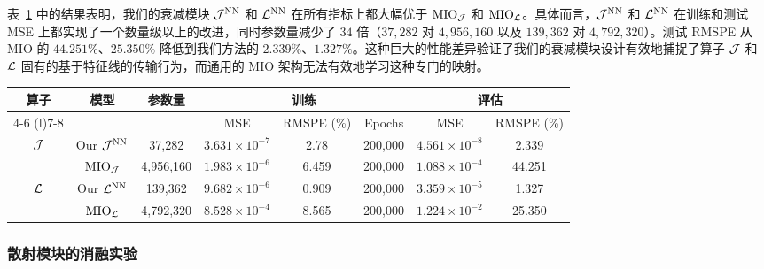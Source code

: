 表~\ref{tab:j_l_compare} 中的结果表明，我们的衰减模块 $\mathcal{J}^{\text{NN}}$ 和 $\mathcal{L}^{\text{NN}}$ 在所有指标上都大幅优于 $\text{MIO}_{\mathcal{J}}$ 和 $\text{MIO}_{\mathcal{L}}$。具体而言，$\mathcal{J}^{\text{NN}}$ 和 $\mathcal{L}^{\text{NN}}$ 在训练和测试 MSE 上都实现了一个数量级以上的改进，同时参数量减少了 $34$ 倍（$37,282$ 对 $4,956,160$ 以及 $139,362$ 对 $4,792,320$）。测试 RMSPE 从 MIO 的 $44.251\%$、$25.350\%$ 降低到我们方法的 $2.339\%$、$1.327\%$。这种巨大的性能差异验证了我们的衰减模块设计有效地捕捉了算子 $\mathcal{J}$ 和 $\mathcal{L}$ 固有的基于特征线的传输行为，而通用的 MIO 架构无法有效地学习这种专门的映射。
\begin{table}
    \centering
    \begin{tabular}{@{}cccccccc@{}}
        \toprule
        \multirow{2}{*}{算子}    & \multirow{2}{*}{模型}   & \multirow{2}{*}{参数量} & \multicolumn{3}{c}{训练} & \multicolumn{2}{c}{评估}                                                 \\
        \cmidrule(l){4-6} \cmidrule(l){7-8}
                               &                       &                      & MSE                    & RMSPE (\%)             & Epochs  & MSE                    & RMSPE (\%) \\
        \midrule
        \multirow{2}{*}{$\mathcal{J}$}  & Our $\mathcal{J}^{\text{NN}}$  & 37,282               & $3.631\times 10^{-7}$  & 2.78                   & 200,000 & $4.561 \times 10^{-8}$ & 2.339      \\
                               & $\text{MIO}_{\mathcal{J}}$     & 4,956,160            & $1.983\times 10^{-6}$  & 6.459                  & 200,000 & $1.088 \times 10^{-4}$ & 44.251     \\
        \midrule
        \multirow{2}{*}{$\mathcal{L}$} & Our $\mathcal{L}^{\text{NN}}$ & 139,362              & $9.682 \times 10^{-6}$ & 0.909                  & 200,000 & $3.359 \times 10^{-5}$ & 1.327      \\
                               & $\text{MIO}_{\mathcal{L}}$    & 4,792,320            & $8.528 \times 10^{-4}$ & 8.565                  & 200,000 & $1.224 \times 10^{-2}$ & 25.350     \\
        \bottomrule
    \end{tabular}
    \label{tab:j_l_compare}
\end{table}

\subsubsection{散射模块的消融实验}

